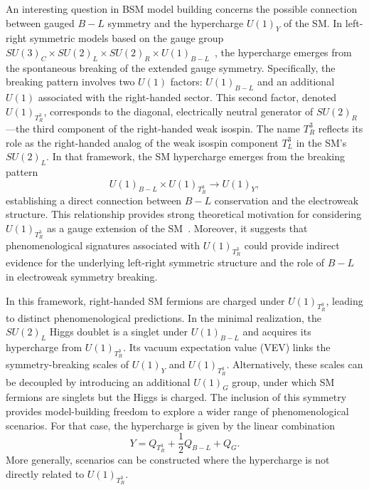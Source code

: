 An interesting question in BSM model building concerns the possible connection between gauged $B-L$ symmetry and the hypercharge $U(1)_Y$ of the SM. In left-right symmetric models based on the gauge group $SU(3)_C \times SU(2)_L \times SU(2)_R \times U(1)_{B-L}$~\parencite{Pati:1974yy, Mohapatra:1974hk, Senjanovic:1975rk}, the hypercharge emerges from the spontaneous breaking of the extended gauge symmetry. Specifically, the breaking pattern involves two $U(1)$ factors: $U(1)_{B-L}$ and an additional $U(1)$ associated with the right-handed sector. This second factor, denoted $U(1)_{T^3_R}$, corresponds to the diagonal, electrically neutral generator of $SU(2)_R$—the third component of the right-handed weak isospin. The name $T^3_R$ reflects its role as the right-handed analog of the weak isospin component $T^3_L$ in the SM's $SU(2)_L$. In that framework, the SM hypercharge emerges from the breaking pattern
\begin{equation}
  U(1)_{B-L} \times U(1)_{T^3_R} \rightarrow U(1)_Y,
\end{equation}
establishing a direct connection between $B-L$ conservation and the electroweak structure. This relationship provides strong theoretical motivation for considering $U(1)_{T^3_R}$ as a gauge extension of the SM~\parencite{Assad:2017iib, MohapatraPati1975, SenjanovicMohapatra1975}. Moreover, it suggests that phenomenological signatures associated with $U(1)_{T^3_R}$ could provide indirect evidence for the underlying left-right symmetric structure and the role of $B-L$ in electroweak symmetry breaking.

In this framework, right-handed SM fermions are charged under $U(1)_{T^3_R}$, leading to distinct phenomenological predictions. In the minimal realization, the $SU(2)_L$ Higgs doublet is a singlet under $U(1)_{B-L}$ and acquires its hypercharge from $U(1)_{T^3_R}$. Its vacuum expectation value (VEV) links the symmetry-breaking scales of $U(1)_Y$ and $U(1)_{T^3_R}$. Alternatively, these scales can be decoupled by introducing an additional $U(1)_G$ group, under which SM fermions are singlets but the Higgs is charged. The inclusion of this symmetry provides model-building freedom to explore a wider range of phenomenological scenarios. For that case, the hypercharge is given by the linear combination
\begin{equation}
Y=Q_{T^3_R}+\frac{1}{2}Q_{B-L} + Q_G.
\end{equation}
More generally, scenarios can be constructed where the hypercharge is not directly related to $U(1)_{T^3_R}$.

